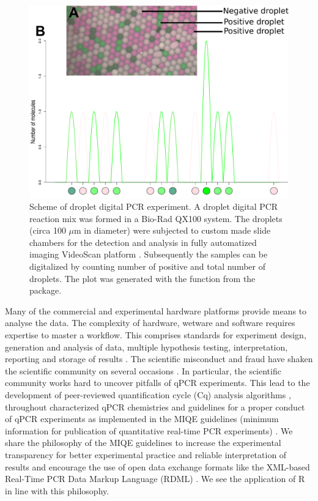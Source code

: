 \begin{figure}[htbp]
  \centering
  \includegraphics[clip=true, width=14cm]{figures/dpcR_sim.pdf}
  \caption{Scheme of droplet digital PCR experiment.  A droplet 
digital PCR reaction mix was formed in a Bio-Rad QX100 system. The droplets 
(circa 100 $\mu$m in diameter) were subjected to custom made slide chambers for 
the detection and analysis in fully automatized imaging VideoScan platform
\citep{rodiger_highly_2013}.  Subsequently the samples can be 
digitalized by counting number of positive and total number of droplets. The 
plot was generated with the  function from the  
package.}
\label{figure:dpcR_sim}
\end{figure}

Many of the commercial and experimental hardware platforms provide means to 
analyse the data. The complexity of hardware, wetware and software requires 
expertise to master a workflow. This comprises standards for experiment design, 
generation and analysis of data, multiple hypothesis testing, interpretation, 
reporting and storage of 
results \citep{huggett_BDQ_2014, conde_2014}. The scientific misconduct and 
fraud have shaken 
the scientific community on several occasions \citep{bustin_2014}. In 
particular, 
the scientific community works hard to uncover pitfalls of qPCR experiments. 
This 
lead to the development of peer-reviewed quantification cycle (Cq) analysis 
algorithms \citep{ruijter_2013}, throughout characterized qPCR chemistries 
\citep{ruijter_2014} and guidelines for a proper conduct of qPCR experiments as 
implemented in the MIQE guidelines (minimum information for publication of 
quantitative real-time PCR experiments) \citep{huggett_2013, bustin_2014}. 
We share the philosophy of the MIQE guidelines to increase the experimental 
transparency for better experimental practice and reliable interpretation of 
results and encourage the use of open data exchange formats like the XML-based 
Real-Time PCR Data Markup Language (RDML) \citep{lefever_2009}. We see the 
application of R in line with this philosophy. 

